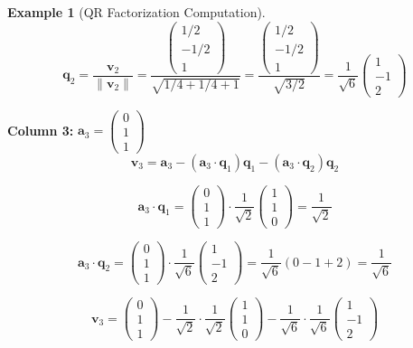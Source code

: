 \documentclass[12pt]{article}
\numberwithin{equation}{section}
\newcommand{\vect}[1]{\boldsymbol{#1}}   %
\theoremstyle{plain}
\theoremstyle{definition}
\newtheorem{example}[theorem]{Example}
\theoremstyle{remark}
\begin{document}
\begin{example}[QR Factorization Computation]
$$\vect{q}_2 = \frac{\vect{v}_2}{\|\vect{v}_2\|} = \frac{\begin{pmatrix} 1/2 \\ -1/2 \\ 1 \end{pmatrix}}{\sqrt{1/4 + 1/4 + 1}} = \frac{\begin{pmatrix} 1/2 \\ -1/2 \\ 1 \end{pmatrix}}{\sqrt{3/2}} = \frac{1}{\sqrt{6}}\begin{pmatrix} 1 \\ -1 \\ 2 \end{pmatrix}$$

\textbf{Column 3:} $\vect{a}_3 = \begin{pmatrix} 0 \\ 1 \\ 1 \end{pmatrix}$
$$\vect{v}_3 = \vect{a}_3 - (\vect{a}_3 \cdot \vect{q}_1)\vect{q}_1 - (\vect{a}_3 \cdot \vect{q}_2)\vect{q}_2$$

$$\vect{a}_3 \cdot \vect{q}_1 = \begin{pmatrix} 0 \\ 1 \\ 1 \end{pmatrix} \cdot \frac{1}{\sqrt{2}}\begin{pmatrix} 1 \\ 1 \\ 0 \end{pmatrix} = \frac{1}{\sqrt{2}}$$

$$\vect{a}_3 \cdot \vect{q}_2 = \begin{pmatrix} 0 \\ 1 \\ 1 \end{pmatrix} \cdot \frac{1}{\sqrt{6}}\begin{pmatrix} 1 \\ -1 \\ 2 \end{pmatrix} = \frac{1}{\sqrt{6}}(0 - 1 + 2) = \frac{1}{\sqrt{6}}$$

$$\vect{v}_3 = \begin{pmatrix} 0 \\ 1 \\ 1 \end{pmatrix} - \frac{1}{\sqrt{2}} \cdot \frac{1}{\sqrt{2}}\begin{pmatrix} 1 \\ 1 \\ 0 \end{pmatrix} - \frac{1}{\sqrt{6}} \cdot \frac{1}{\sqrt{6}}\begin{pmatrix} 1 \\ -1 \\ 2 \end{pmatrix}$$


\end{example}
\end{document}
